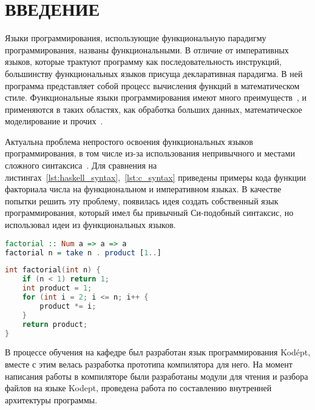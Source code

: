 \chapter*{ВВЕДЕНИЕ}\label{ch:introduction}


Языки программирования, использующие функциональную парадигму программирования, названы функциональными.
В отличие от императивных языков, которые трактуют программу как последовательность инструкций, большинству функциональных языков присуща декларативная парадигма.
В ней программа представляет собой процесс вычисления функций в математическом стиле.
Функциональные языки программирования имеют много преимуществ~\cite{WhyFunctional},
и применяются в таких областях, как обработка больших данных, математическое моделирование и прочих~\cite{ScalaBigData}.

Актуальна проблема непростого освоения функциональных языков программирования, в том числе из-за использования непривычного и местами сложного синтаксиса~\cite{HaskellBook}.
Для сравнения на листингах~\ref{lst:haskell_syntax},~\ref{lst:c_syntax} приведены примеры кода функции факториала числа на функциональном и императивном языках.
В качестве попытки решить эту проблему, появилась идея создать собственный язык программирования, который имел бы привычный Си-подобный синтаксис, но использовал идеи из функциональных языков.

\begin{lstlisting}[label={lst:haskell_syntax}, language=Haskell, caption={Пример функции факториала числа в языке Haskell}]
factorial :: Num a => a => a
factorial n = take n . product [1..]
\end{lstlisting}

\begin{lstlisting}[label={lst:c_syntax}, caption={Пример функции факториала числа в языке C}, language=C]
int factorial(int n) {
    if (n < 1) return 1;
    int product = 1;
    for (int i = 2; i <= n; i++ {
        product *= i;
    }
    return product;
}
\end{lstlisting}

В процессе обучения на кафедре был разработан язык программирования Kodépt, вместе с этим велась разработка прототипа компилятора для него.
На момент написания работы в компиляторе были разработаны модули для чтения и разбора файлов на языке Kodept, проведена работа по составлению внутренней архитектуры программы.

